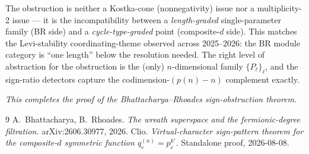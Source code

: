 \documentclass[11pt]{article}
\theoremstyle{definition}
\begin{document}
The obstruction is neither a Kostka-cone (nonnegativity) issue nor a
multiplicity-2 issue --- it is the incompatibility between a
\emph{length-graded} single-parameter family (BR side) and a
\emph{cycle-type-graded} point (composite-$d$ side). This matches the
Levi-stability coordinating-theme observed across 2025--2026: the BR
module category is ``one length'' below the resolution needed. The right
level of abstraction for the obstruction is the (only) $n$-dimensional
family $\{P_\ell\}_\ell$, and the sign-ratio detectors capture the
codimension-$(p(n)-n)$ complement exactly.

\medskip

\emph{This completes the proof of the Bhattacharya--Rhoades sign-obstruction theorem.}

\begin{thebibliography}{9}
 A.\ Bhattacharya, B.\ Rhoades.
    \emph{The wreath superspace and the fermionic-degree filtration.}
    arXiv:2606.30977, 2026.
 Clio.
    \emph{Virtual-character sign-pattern theorem for the composite-$d$ symmetric function $q_e^{(n)}=p_e^{k'}$.}
    Standalone proof, 2026-08-08.
\end{thebibliography}
\end{document}
